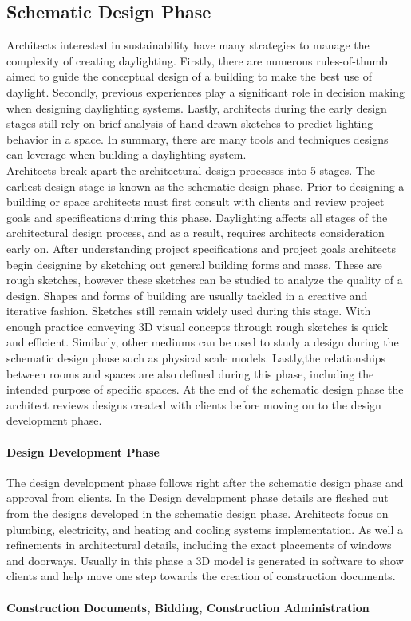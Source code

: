   \subsection{Schematic Design Phase}
    Architects interested in sustainability have many strategies to manage the complexity of creating daylighting.
    Firstly, there are numerous rules-of-thumb aimed to guide the conceptual design of a building to make the best use of daylight.
    Secondly, previous experiences play a significant role in decision making when designing daylighting systems. Lastly, architects during the early design stages still rely on brief analysis of hand drawn sketches to predict lighting behavior in a space. In summary, there are many tools and techniques designs can leverage when building a daylighting system.\\


  Architects break apart the architectural design processes into 5 stages. 
  The earliest design stage is known as the schematic design phase.
  Prior to designing a building or space architects must first consult with clients and review project goals and specifications during this phase.
  Daylighting affects all stages of the architectural design process, and as a result, requires architects consideration early on.
  After understanding project specifications and project goals architects begin designing by sketching out general building forms and mass. These are rough sketches, however these sketches can be studied to analyze the quality of a design. Shapes and forms of building are usually tackled in a creative and iterative fashion. Sketches still remain widely used during this stage. With enough practice conveying 3D visual concepts through rough sketches is quick and efficient.
  Similarly, other mediums can be used to study a design during the schematic design phase such as physical scale models.
  Lastly,the relationships between rooms and spaces are also defined during this phase, including the intended purpose of specific spaces.
  At the end of the schematic design phase the architect reviews designs created with clients before moving on to the design development phase.

  \paragraph{Design Development Phase} 
  The design development phase follows right after the schematic design phase and approval from clients.
  In the Design development phase details are fleshed out from the designs developed in the schematic design phase.
  Architects focus on plumbing, electricity, and heating and cooling systems implementation.
  As well a refinements in architectural details, including the exact placements of windows and doorways.
  Usually in this phase a 3D model is generated in software to show clients and help move one step towards the creation of construction documents.

  \paragraph{Construction Documents, Bidding, Construction Administration} 

